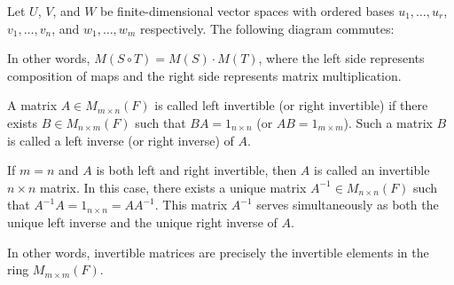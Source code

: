 \begin{theorem}
Let $U$, $V$, and $W$ be finite-dimensional vector spaces with ordered bases $u_1,\ldots,u_r$, $v_1,\ldots,v_n$, and $w_1,\ldots,w_m$ respectively. The following diagram commutes:

\begin{center}
\end{center}

In other words, $M(S \circ T) = M(S) \cdot M(T)$, where the left side represents composition of maps and the right side represents matrix multiplication.
\end{theorem}

\begin{definition}
A matrix $A \in M_{m\times n}(F)$ is called left invertible (or right invertible) if there exists $B \in M_{n\times m}(F)$ such that $BA = 1_{n\times n}$ (or $AB = 1_{m\times m}$). Such a matrix $B$ is called a left inverse (or right inverse) of $A$.

If $m = n$ and $A$ is both left and right invertible, then $A$ is called an invertible $n\times n$ matrix. In this case, there exists a unique matrix $A^{-1} \in M_{n\times n}(F)$ such that $A^{-1}A = 1_{n\times n} = AA^{-1}$. This matrix $A^{-1}$ serves simultaneously as both the unique left inverse and the unique right inverse of $A$.

In other words, invertible matrices are precisely the invertible elements in the ring $M_{m\times m}(F)$.
\end{definition}
